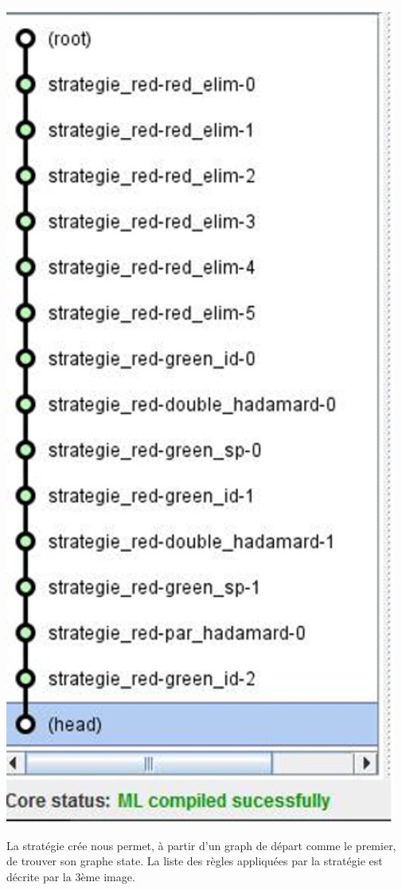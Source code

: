 \documentclass[a4paper,oneside]{book}
\begin{document}
\begin{center}
\includegraphics[scale=0.6]{IMG/strat3.eps}

\end{center}

La stratégie crée nous permet, à partir d'un graph de départ comme le premier, de trouver son graphe state. La liste des règles appliquées par la stratégie est décrite par la 3ème image. 
\end{document}
